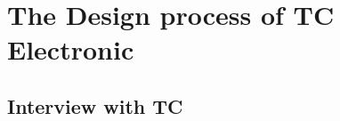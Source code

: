 \chapter{The Design process of TC Electronic}
\label{Interview}



\section{Interview with TC}
\label{InterviewInputs}

